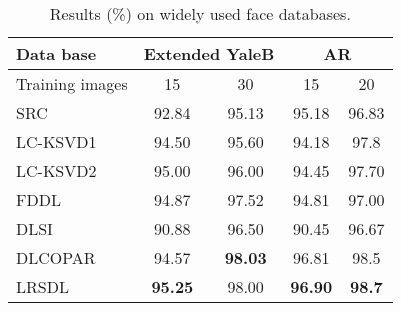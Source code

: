 \documentclass[letterpaper]{article}
\begin{document}
\begin{table}[]
\centering
\small
\caption{Results (\%) on widely used face databases.}
\label{tab:face}
\begin{tabular}{|l||c|c|c|c|}
\hline
Data base       & \multicolumn{2}{c|}{Extended YaleB} & \multicolumn{2}{c|}{AR}        \\ \hline
Training images                     & 15             & 30             & 15             & 20            \\ \hline
\hline
SRC\cite{Wright2009SRC}             & 92.84          & 95.13          & 95.18          & 96.83         \\ \hline
LC-KSVD1\cite{Zhuolin2013LCKSVD}    & 94.50          & 95.60          & 94.18          & 97.8          \\ \hline
LC-KSVD2\cite{Zhuolin2013LCKSVD}    & 95.00          & 96.00          & 94.45          & 97.70         \\ \hline
FDDL\cite{Meng2011FDDL}             & 94.87          & 97.52          & 94.81          & 97.00         \\ \hline
DLSI\cite{ramirez2010classification}& 90.88          & 96.50          & 90.45          & 96.67         \\ \hline
DLCOPAR\cite{kong2012dictionary}    & 94.57          & \textbf{98.03} & 96.81          & 98.5          \\ \hline
\hline
LRSDL                           & \textbf{95.25} & 98.00          & \textbf{96.90} & \textbf{98.7} \\ \hline
\end{tabular}
\end{table}
\end{document}
